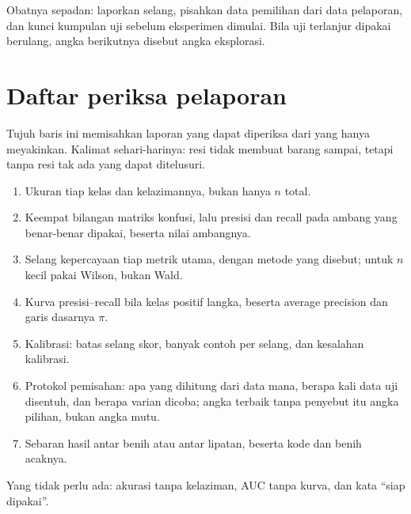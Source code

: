 Obatnya sepadan: laporkan selang, pisahkan data pemilihan dari data pelaporan, dan kunci
kumpulan uji sebelum eksperimen dimulai. Bila uji terlanjur dipakai berulang, angka
berikutnya disebut angka eksplorasi.

\section{Daftar periksa pelaporan}

Tujuh baris ini memisahkan laporan yang dapat diperiksa dari yang hanya meyakinkan.
Kalimat sehari-harinya: resi tidak membuat barang sampai, tetapi tanpa resi tak ada yang
dapat ditelusuri.

\begin{enumerate}
  \item Ukuran tiap kelas dan kelazimannya, bukan hanya $n$ total.
  \item Keempat bilangan matriks konfusi, lalu presisi dan recall pada ambang yang
        benar-benar dipakai, beserta nilai ambangnya.
  \item Selang kepercayaan tiap metrik utama, dengan metode yang disebut; untuk $n$ kecil
        pakai Wilson, bukan Wald.
  \item Kurva presisi--recall bila kelas positif langka, beserta average precision dan
        garis dasarnya $\pi$.
  \item Kalibrasi: batas selang skor, banyak contoh per selang, dan kesalahan kalibrasi.
  \item Protokol pemisahan: apa yang dihitung dari data mana, berapa kali data uji
        disentuh, dan berapa varian dicoba; angka terbaik tanpa penyebut itu angka
        pilihan, bukan angka mutu.
  \item Sebaran hasil antar benih atau antar lipatan, beserta kode dan benih acaknya.
\end{enumerate}

Yang tidak perlu ada: akurasi tanpa kelaziman, AUC tanpa kurva, dan kata ``siap
dipakai''.

